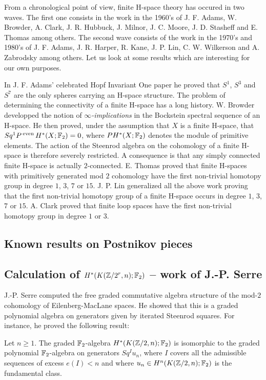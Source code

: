 From a chronological point of view, finite H-space theory has occured in two waves. The first one consists in the work in the 1960's of J. F. Adams, W. Browder, A. Clark, J. R. Hubbuck, J. Milnor, J. C. Moore, J. D. Stasheff and E. Thomas among others. The second wave consists of the work in the 1970's and 1980's of J. F. Adams, J. R. Harper, R. Kane, J. P. Lin, C. W. Wilkerson and A. Zabrodsky among others. Let us look at some results which are interesting for our own purposes.

In J. F. Adams' celebrated Hopf Invariant One paper \cite{Ad60} he proved that $S^1$, $S^3$ and $S^7$ are the only spheres carrying an H-space structure. The problem of determining the connectivity of a finite H-space has a long history. W. Browder \cite{Br61} developped the notion of {\it $\infty$-implications} in the Bockstein spectral sequence of an H-space. He then proved, under the assumption that $X$ is a finite H-space, that $Sq^1P\operatorname{^{even}} H^*(X;\mathbb{F}_2)=0$, where $PH^*(X;\mathbb{F}_2)$ denotes the module of primitive elements. The action of the Steenrod algebra on the cohomology of a finite H-space is therefore severely restricted. A consequence is that any simply connected finite H-space is actually $2$-connected. E. Thomas \cite{To62} proved that finite H-spaces with primitively generated mod $2$ cohomology have the first non-trivial homotopy group in degree $1$, $3$, $7$ or $15$. J. P. Lin \cite{Li87} generalized all the above work proving that the first non-trivial homotopy group of a finite H-space occurs in  degree $1$, $3$, $7$ or $15$. A. Clark \cite{Cl63} proved that finite loop spaces have the first non-trivial homotopy group in degree $1$ or $3$.

\subsection{Known results on Postnikov pieces}

\subsection*{Calculation of $H^*(K(\mathbb{Z}/2^r,n);\mathbb{F}_2)$ -- work of J.-P. Serre}

J.-P. Serre \cite{Se53} computed the free graded commutative algebra structure of the mod-$2$ cohomology of Eilenberg-MacLane spaces. He showed that this is a graded polynomial algebra on generators given by iterated Steenrod squares. For instance, he proved the following result:

\begin{thm*}
Let $n\geq1$. The graded $\mathbb{F}_2$-algebra $H^*(K(\mathbb{Z}/2,n);\mathbb{F}_2)$ is isomorphic to the graded polynomial $\mathbb{F}_2$-algebra on generators $Sq^I u_n$, where $I$ covers all the admissible sequences of excess $e(I)<n$ and where $u_n\in H^n(K(\mathbb{Z}/2,n);\mathbb{F}_2)$ is the fundamental class.
\end{thm*}

